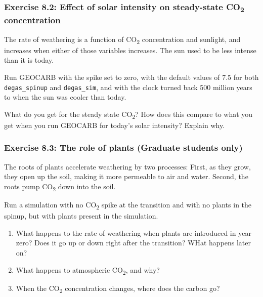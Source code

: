 \documentclass[
]{article}
\begin{document}
\hypertarget{exercise-8.2-effect-of-solar-intensity-on-steady-state-co2-concentration}{%
\subsubsection{\texorpdfstring{Exercise 8.2: Effect of solar intensity
on steady-state CO\textsubscript{2}
concentration}{Exercise 8.2: Effect of solar intensity on steady-state CO2 concentration}}\label{exercise-8.2-effect-of-solar-intensity-on-steady-state-co2-concentration}}

The rate of weathering is a function of CO\textsubscript{2}
concentration and sunlight, and increases when either of those variables
increases. The sun used to be less intense than it is today.

Run GEOCARB with the spike set to zero, with the default values of 7.5
for both \texttt{degas\_spinup} and \texttt{degas\_sim}, and with the
clock turned back 500 million years to when the sun was cooler than
today.

What do you get for the steady state CO\textsubscript{2}? How does this
compare to what you get when you run GEOCARB for today's solar
intensity? Explain why.

\hypertarget{exercise-8.3-the-role-of-plants-graduate-students-only}{%
\subsubsection{\texorpdfstring{Exercise 8.3: The role of plants
(\textbf{Graduate students
only})}{Exercise 8.3: The role of plants (Graduate students only)}}\label{exercise-8.3-the-role-of-plants-graduate-students-only}}

The roots of plants accelerate weathering by two processes: First, as
they grow, they open up the soil, making it more permeable to air and
water. Second, the roots pump CO\textsubscript{2} down into the soil.

Run a simulation with no CO\textsubscript{2} spike at the transition and
with no plants in the spinup, but with plants present in the simulation.

\begin{enumerate}
\def\labelenumi{\alph{enumi})}
\item
  What happens to the rate of weathering when plants are introduced in
  year zero? Does it go up or down right after the transition? WHat
  happens later on?
\item
  What happens to atmospheric CO\textsubscript{2}, and why?
\item
  When the CO\textsubscript{2} concentration changes, where does the
  carbon go?
\end{enumerate}
\end{document}
